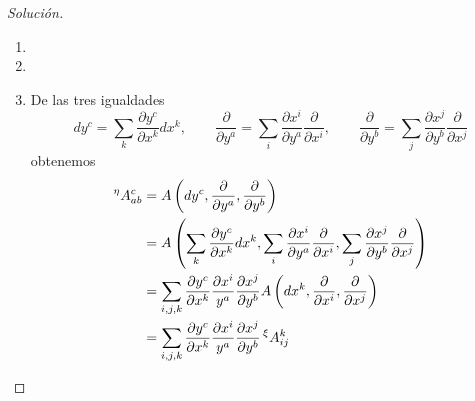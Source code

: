 \documentclass[spanish]{book}
\theoremstyle{definition}
\begin{document}
	\begin{proof}[Solución]
		\leavevmode
		\begin{enumerate}
			\item 
			\item 
			\item De las tres igualdades
			\[dy^c=\sum_k\frac{\partial y^c}{\partial x^k}dx^k,\qquad \frac{\partial}{\partial y^a}=\sum_i\frac{\partial x^i}{\partial y^a}\frac{\partial}{\partial x^i},\qquad \frac{\partial}{\partial y^b}=\sum_j\frac{\partial x^j}{\partial y^b}\frac{\partial}{\partial x^j}\]
			obtenemos
			\begin{align*}
				\prescript{\eta}{}{A}^c_{ab}&=A\left(dy^c,\frac{\partial}{\partial y^a},\frac{\partial}{\partial y^b}\right)\\
				&=A\left(\sum_k\frac{\partial y^c}{\partial x^k}dx^k,\sum_i\frac{\partial x^i}{\partial y^a}\frac{\partial}{\partial x^i},\sum_j\frac{\partial x^j}{\partial y^b}\frac{\partial}{\partial x^j}\right)\\
				&=\sum_{i,j,k}\frac{\partial y^c}{\partial x^k}\frac{\partial x^i}{y^a}\frac{\partial x^j}{\partial y^b}A\left(dx^k,\frac{\partial}{\partial x^i},\frac{\partial}{\partial x^j}\right)\\
				&=\sum_{i,j,k}\frac{\partial y^c}{\partial x^k}\frac{\partial x^i}{y^a}\frac{\partial x^j}{\partial y^b}\prescript{\xi}{}{A}^k_{ij}
			\end{align*}
		\end{enumerate}
	\end{proof}
\end{document}
